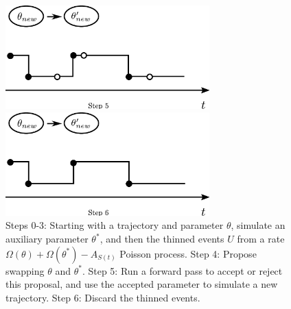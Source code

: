 \begin{figure}[H]
\begin{minipage}[hp]{0.45\linewidth}
    \vspace{-0 in}
  \end{minipage}
  \begin{minipage}[hp]{0.45\linewidth}
  \centering
    \includegraphics [width=0.70\textwidth, angle=0]{figs/plot5.pdf}
    \vspace{-0 in}
  \end{minipage}
  \begin{minipage}[hp]{0.45\linewidth}
  \centering
    \includegraphics [width=0.70\textwidth, angle=0]{figs/plot6.pdf}
    \vspace{-0 in}
  \end{minipage}
    \caption{Steps 0-3: Starting with a trajectory and parameter $\theta$,
      simulate an auxiliary parameter $\theta^*$, and then the thinned events
      $U$ from a rate $\Omega(\theta) + \Omega(\theta^*) - A_{S(t)}$ Poisson
      process. Step 4: Propose swapping $\theta$ and $\theta^*$. Step 5:
      Run a forward pass to accept or reject this proposal, and use the accepted
    parameter to simulate a new trajectory. Step 6: Discard the thinned events.} 
   \label{fig:MH_improved}

  \end{figure}
